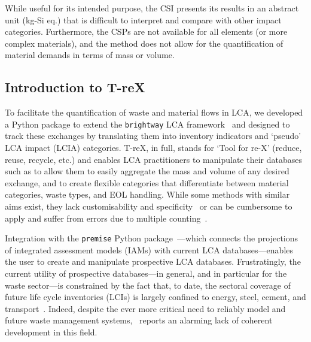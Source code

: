While useful for its intended purpose, the CSI presents its results in an abstract unit (kg-Si eq.) that is difficult to interpret and compare with other impact categories. Furthermore, the CSPs are not available for all elements (or more complex materials), and the method does not allow for the quantification of material demands in terms of mass or volume.

\subsection{Introduction to T-reX}\label{sec:intro-trex}

To facilitate the quantification of waste and material flows in LCA, we developed a Python package to extend the \texttt{brightway} LCA framework~\citep{mutel2017brightway} and designed to track these exchanges by translating them into inventory indicators and `pseudo' LCA impact (LCIA) categories. T-reX, in full, stands for `Tool for re-X' (reduce, reuse, recycle, etc.) and enables LCA practitioners to manipulate their databases such as to allow them to easily aggregate the mass and volume of any desired exchange, and to create flexible categories that differentiate between material categories, waste types, and EOL handling. While some methods with similar aims exist, they lack customisability and specificity~\citep{foen2021ecofactors} or can be cumbersome to apply and suffer from errors due to multiple counting~\citep{laurenti2023wastefootprint}.

Integration with the \texttt{premise} Python package~\citep{sacchi2022premise}---which connects the projections of integrated assessment models (IAMs) with current LCA databases---enables the user to create and manipulate prospective LCA databases. Frustratingly, the current utility of prospective databases---in general, and in particular for the waste sector---is constrained by the fact that, to date, the sectoral coverage of future life cycle inventories (LCIs) is largely confined to energy, steel, cement, and transport~\citep{sacchi2023premisedocs}. Indeed, despite the ever more critical need to reliably model and future waste management systems,~\cite{bisinella2024wastelca} reports an alarming lack of coherent development in this field.

